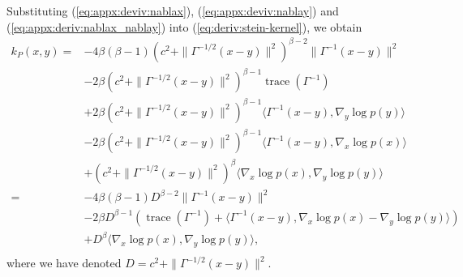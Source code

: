 \documentclass[11pt,a4paper]{report}
\DeclareMathOperator{\trace}{trace}
\begin{document}
Substituting (\ref{eq:appx:deviv:nablax}), (\ref{eq:appx:deviv:nablay}) and (\ref{eq:appx:deriv:nablax_nablay}) into (\ref{eq:deriv:stein-kernel}), we obtain
\begin{equation}
\begin{aligned}
k_P(x, y)
= &-4 \beta(\beta-1) \left(c^2 + \| \Gamma^{-1/2}(x-y)\|^2\right)^{\beta-2} \| \Gamma^{-1}(x - y)\|^2 \\
&- 2\beta \left(c^2 + \|\Gamma^{-1/2}(x-y)\|^2\right)^{\beta-1} \trace(\Gamma^{-1}) \\
&+ 2 \beta \left(c^2 + \| \Gamma^{-1/2} (x-y)\|^2\right)^{\beta-1} \langle \Gamma^{-1} (x - y), \nabla_y \log p(y)\rangle \\
&- 2 \beta \left(c^2 + \| \Gamma^{-1/2} (x-y)\|^2\right)^{\beta-1} \langle \Gamma^{-1} (x - y), \nabla_x \log p(x)\rangle \\
&+ \left(c^2 + \| \Gamma^{-1/2} (x-y)\|^2\right)^\beta \langle \nabla_x \log p(x), \nabla_y \log p(y) \rangle \\
= &-4 \beta(\beta-1) D^{\beta-2} \| \Gamma^{-1}(x - y)\|^2  \\
&- 2 \beta D^{\beta-1} (\trace(\Gamma^{-1}) + \langle \Gamma^{-1} (x - y), \nabla_x \log p(x) - \nabla_y \log p(y)\rangle) \\
&+ D^\beta \langle \nabla_x \log p(x), \nabla_y \log p(y) \rangle, \\
\end{aligned}
\label{eq:k_P:IMQ}
\end{equation}
where we have denoted $D = c^2 + \| \Gamma^{-1/2}(x-y)\|^2$.




\end{document}
